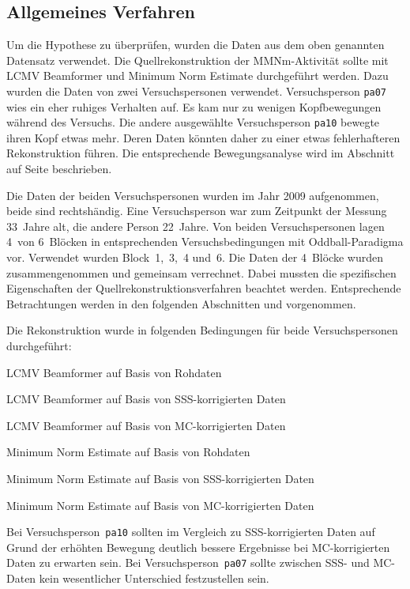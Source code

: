 \documentclass[doc,a4paper,12pt]{apa6}
\makeatletter
\DeclareRobustCommand*{\nameref}[1]{%
      \glqq{\myorg@nameref{#1}}\grqq%
    }%
\makeatother
\begin{document}
\subsection{Allgemeines Verfahren}

Um die Hypothese zu überprüfen, wurden die Daten aus dem oben genannten Datensatz verwendet. Die Quellrekonstruktion der MMNm-Aktivität sollte mit LCMV Beamformer und Minimum Norm Estimate durchgeführt werden. Dazu wurden die Daten von zwei Versuchspersonen verwendet. Versuchsperson \texttt{pa07} wies ein eher ruhiges Verhalten auf. Es kam nur zu wenigen Kopfbewegungen während des Versuchs. Die andere ausgewählte Versuchsperson \texttt{pa10} bewegte ihren Kopf etwas mehr. Deren Daten könnten daher zu einer etwas fehlerhafteren Rekonstruktion führen. Die entsprechende Bewegungsanalyse wird im Abschnitt \nameref{sec:bewegung} auf Seite \pageref{sec:bewegung} beschrieben.

Die Daten der beiden Versuchspersonen wurden im Jahr 2009 aufgenommen, beide sind rechtshändig. Eine Versuchsperson war zum Zeitpunkt der Messung 33~Jahre alt, die andere Person 22~Jahre. Von beiden Versuchspersonen lagen 4~von 6~Blöcken in entsprechenden Versuchsbedingungen mit Oddball-Paradigma vor. Verwendet wurden Block~1,~3,~4 und~6. Die Daten der 4~Blöcke wurden zusammengenommen und gemeinsam verrechnet. Dabei mussten die spezifischen Eigenschaften der Quellrekonstruktionsverfahren beachtet werden. Entsprechende Betrachtungen werden in den folgenden Abschnitten \nameref{sec:lead-beam-mne} und \nameref{sec:amplitud} vorgenommen.

Die Rekonstruktion wurde in folgenden Bedingungen für beide Versuchspersonen durchgeführt:

\begin{compactitem}
\item LCMV Beamformer auf Basis von Rohdaten
\item LCMV Beamformer auf Basis von SSS-korrigierten Daten
\item LCMV Beamformer auf Basis von MC-korrigierten Daten
\item Minimum Norm Estimate auf Basis von Rohdaten
\item Minimum Norm Estimate auf Basis von SSS-korrigierten Daten
\item Minimum Norm Estimate auf Basis von MC-korrigierten Daten
\end{compactitem}

Bei Versuchsperson~\texttt{pa10} sollten im Vergleich zu SSS-korrigierten Daten auf Grund der erhöhten Bewegung deutlich bessere Ergebnisse bei MC-korrigierten Daten zu erwarten sein. Bei Versuchsperson~\texttt{pa07} sollte zwischen SSS- und MC-Daten kein wesentlicher Unterschied festzustellen sein.
\end{document}
